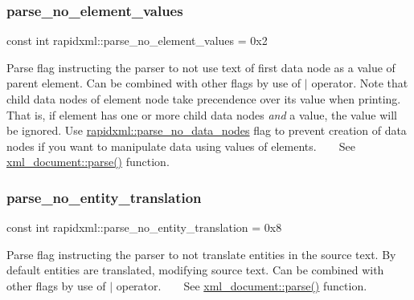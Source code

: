 \subsubsection{\texorpdfstring{parse\_no\_element\_values}{parse\_no\_element\_values}}
{\footnotesize\ttfamily const int rapidxml\+::parse\+\_\+no\+\_\+element\+\_\+values = 0x2}

Parse flag instructing the parser to not use text of first data node as a value of parent element. Can be combined with other flags by use of $\vert$ operator. Note that child data nodes of element node take precendence over its value when printing. That is, if element has one or more child data nodes {\itshape and} a value, the value will be ignored. Use \mbox{\hyperlink{namespacerapidxml_ac2d21ef14a4e8936b94aca5d38b1a74d}{rapidxml\+::parse\+\_\+no\+\_\+data\+\_\+nodes}} flag to prevent creation of data nodes if you want to manipulate data using values of elements. ~\newline
~\newline
 See \mbox{\hyperlink{classrapidxml_1_1xml__document_ac6e73ff9ac323bf5a370c38feb03a6b1}{xml\+\_\+document\+::parse()}} function. \mbox{\label{namespacerapidxml_a89113c103ffaf77615d1aa330c8dcca8}} 
\subsubsection{\texorpdfstring{parse\_no\_entity\_translation}{parse\_no\_entity\_translation}}
{\footnotesize\ttfamily const int rapidxml\+::parse\+\_\+no\+\_\+entity\+\_\+translation = 0x8}

Parse flag instructing the parser to not translate entities in the source text. By default entities are translated, modifying source text. Can be combined with other flags by use of $\vert$ operator. ~\newline
~\newline
 See \mbox{\hyperlink{classrapidxml_1_1xml__document_ac6e73ff9ac323bf5a370c38feb03a6b1}{xml\+\_\+document\+::parse()}} function. \mbox{\label{namespacerapidxml_af3fc88ba6bee33482a2db81b1da36ea1}} 
